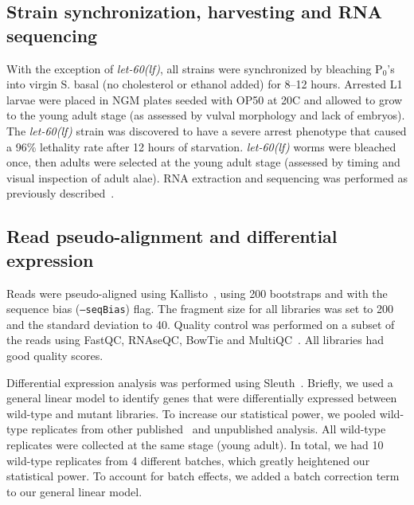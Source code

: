 \documentclass[10pt, onecolumn]{article}
\newcommand{\gene}[1]{\mbox{\emph{#1}}}
\newcommand{\letlf}{\gene{let-60(lf)}}
\begin{document}
\subsection*{Strain synchronization, harvesting and RNA sequencing}
With the exception of \letlf{}, all strains were synchronized by bleaching
P$_0$'s into virgin S. basal (no cholesterol or ethanol added) for 8--12 hours.
Arrested L1 larvae were placed in NGM plates seeded with OP50 at 20\degree{}C
and allowed to grow to the young adult stage (as assessed by vulval morphology
and lack of  embryos). The \letlf{} strain was discovered to have a severe
arrest phenotype that caused a 96\% lethality rate after 12 hours of starvation.
\letlf{} worms were bleached once, then adults were selected at the young adult
stage (assessed by timing and visual inspection of adult alae). RNA extraction
and sequencing was performed as previously described~\cite{}.

\subsection*{Read pseudo-alignment and differential expression}
Reads were pseudo-aligned using Kallisto~\cite{Bray2016}, using 200 bootstraps
and with the sequence bias (\texttt{--seqBias}) flag. The fragment size for all
libraries was set to 200 and the standard deviation to 40. Quality control was
performed on a subset of the reads using FastQC, RNAseQC, BowTie and
MultiQC~\cite{Andrews2010,Deluca2012,Langmead2009,Ewels2016}. All libraries had
good quality scores.

Differential expression analysis was performed using
Sleuth~\cite{Pimentel2016a}. Briefly, we used a general linear model to identify
genes that were differentially expressed between wild-type and mutant libraries.
To increase our statistical power, we pooled wild-type replicates from other
published~\cite{} and unpublished analysis. All wild-type replicates were
collected at the same stage (young adult). In total, we had 10 wild-type
replicates from 4 different batches, which greatly heightened our statistical
power. To account for batch effects, we added a batch correction term to our
general linear model.
\end{document}

